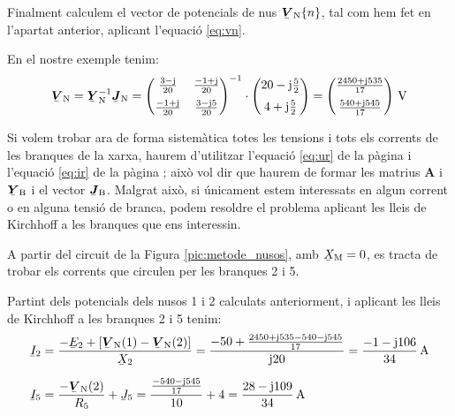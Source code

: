 Finalment
calculem el vector de potencials de nus $\mcmplx{V}\ped{N}\{n\}$, tal
com  hem fet en l'apartat anterior, aplicant l'equació \eqref{eq:vn}.

En el nostre exemple tenim:
\[
   \mcmplx{V}\ped{N} = \mcmplx{Y}\ped{N}^{-1} \mcmplx{J}\ped{N} =
   \begin{pmatrix}
         \frac{3 - \ju}{20}  & \frac{-1 + \ju}{20} \\[2mm]
         \frac{-1 + \ju}{20} & \frac{3 - \ju 5}{20}
   \end{pmatrix} ^{-1} \cdot
   \begin{pmatrix}
            20 - \ju \frac{5}{2} \\[2mm]
            4 + \ju \frac{5}{2}
   \end{pmatrix} =
   \begin{pmatrix}
         \frac{2450 + \ju 535}{17} \\[2mm]
         \frac{540  + \ju 545}{17}
   \end{pmatrix}\si{\,V}
\]

Si volem trobar ara de forma sistemàtica totes les tensions i tots
els corrents   de les branques de la xarxa, haurem d'utilitzar
l'equació \eqref{eq:ur} de la pàgina \pageref{eq:ur} i l'equació
\eqref{eq:ir} de la pàgina \pageref{eq:ir}; això vol dir que haurem
de formar les matrius $\boldsymbol{A}$ i $\mcmplx{Y}\ped{B}$ i el
vector $\mcmplx{J}\ped{B}$. Malgrat això, si únicament estem
interessats en algun corrent o en alguna tensió de branca, podem
resoldre el problema aplicant les lleis de Kirchhoff a les branques
que ens interessin.


\begin{exemple}
    A partir del circuit de la Figura \vref{pic:metode_nusos}, amb
    $\cmplx{X}\ped{M}=0$, es tracta de trobar els corrents que circulen
    per les branques 2 i 5.

    Partint dels potencials dels nusos 1 i 2 calculats anteriorment, i
    aplicant les lleis de Kirchhoff a les branques 2 i 5 tenim:
    \begin{align*}
       \cmplx{I}_2 &= \frac{-\cmplx{E}_2 + [\mcmplx{V}\ped{N}(1) - \mcmplx{V}\ped{N}(2)]}
                      {\cmplx{X}_2} = \frac{-50 + \frac{2450+\ju 535 -540
                      - \ju 545}{17}} {\ju 20} = \frac{-1 - \ju 106}{34}\si{\,A} \\[1.5ex]
       \cmplx{I}_5 &=  \frac{- \mcmplx{V}\ped{N}(2)}{R_5}  + \cmplx{J}_5 =
                      \frac{\frac{-540 - \ju 545}{17}}{10} + 4 =
                      \frac{28 - \ju 109}{34}\si{\,A}
    \end{align*}
\end{exemple}

